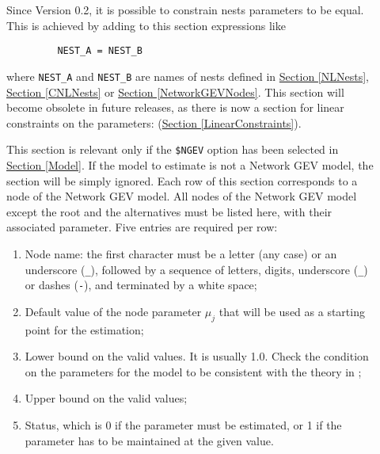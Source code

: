 \documentclass[12pt]{memoir}
\begin{document}
\begin{description}
   \item[] Since Version 0.2, it is possible to
      constrain nests parameters to be equal. This is achieved by adding to this section expressions like
      \small 
{\footnotesize
      \begin{verbatim}
         NEST_A = NEST_B
      \end{verbatim} 
}
      \normalsize
      where \verb+NEST_A+ and \verb+NEST_B+ are names of nests defined in \hyperlink{NLNests}{Section [NLNests]}, \hyperlink{CNLNests}{Section [CNLNests]} or  \hyperlink{NetworkGEVNodes}{Section [NetworkGEVNodes]}. This section will become obsolete in future releases, as there is now a section for linear constraints on the parameters: (\hyperlink{LinearConstraints}{Section [LinearConstraints]}).

   \item[] This section is relevant only if the
      \verb+$NGEV+ option has been selected in \hyperlink{Model}{Section
      [Model]}. If the model to estimate is not a Network GEV model, the section
      will be simply ignored.  Each row of this section corresponds to a node of the
      Network GEV model.
      All nodes of the
      Network GEV model except the root and the alternatives must be listed here,
      with their associated parameter.
       Five entries are required per row: 
      \begin{enumerate}
         \item Node name:   the first character must be a letter (any case) or an underscore
            (\verb+_+), followed by a sequence of letters, digits, underscore (\verb+_+)
            or dashes (\verb+-+), and terminated by a white space;
         \item Default value of the node parameter $\mu_j$ that will be used as a starting point for the estimation;
         \item Lower bound on the valid values. It is usually 1.0. Check the condition
            on the parameters for the model to be consistent with the theory in ;
         \item Upper bound on the valid values;
         \item Status, which is 0 if the parameter must be estimated, or 1 if the parameter has to be maintained at the given value. 
      \end{enumerate}


\end{description}
\end{document}
